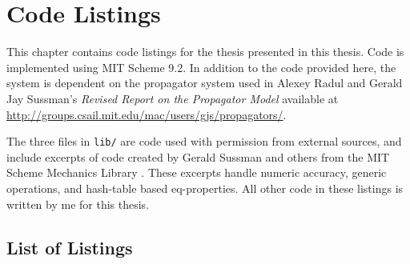 \chapter{Code Listings}
\label{chap:code}

This chapter contains code listings for the thesis presented in this
thesis. Code is implemented using MIT Scheme 9.2. In addition to the
code provided here, the system is dependent on the propagator system
used in Alexey Radul and Gerald Jay Sussman's \emph{Revised Report on
  the Propagator Model} available at
\url{http://groups.csail.mit.edu/mac/users/gjs/propagators/}.

The three files in \texttt{lib/} are code used with permission from
external sources, and include excerpts of code created by Gerald
Sussman and others from the MIT Scheme Mechanics Library
\cite{scmutils}. These excerpts handle numeric accuracy, generic
operations, and hash-table based eq-properties. All other code in
these listings is written by me for this thesis.

\section*{List of Listings}
\lolnoheading


\newcommand{\includecode}[2][c]{}
\newpage
\linespread{1}

\addtolength{\oddsidemargin}{-.4in}
\addtolength{\evensidemargin}{-.4in}
\addtolength{\textwidth}{0.8in}

